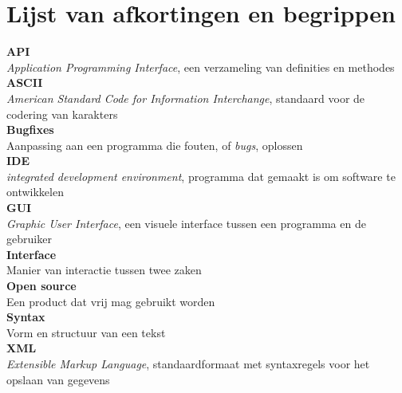 \chapter*{Lijst van afkortingen en begrippen}

\textbf{API}
\\ 
\textit{Application Programming Interface}, een verzameling van definities en methodes
\\
\textbf{ASCII}
\\ 
\textit{American Standard Code for Information Interchange}, standaard voor de codering van karakters
\\
\textbf{Bugfixes}
\\ 
Aanpassing aan een programma die fouten, of \textit{bugs}, oplossen 
\\
\textbf{IDE}
\\ 
\textit{integrated development environment}, programma dat gemaakt is om software te ontwikkelen
\\
\textbf{GUI} 
\\ 
\textit{Graphic User Interface}, een visuele interface tussen een programma en de gebruiker
\\
\textbf{Interface} 
\\ 
Manier van interactie tussen twee zaken
\\
\textbf{Open source}
\\ 
Een product dat vrij mag gebruikt worden
\\
\textbf{Syntax}
\\ 	
Vorm en structuur van een tekst
\\
\textbf{XML} 
\\
\textit{Extensible Markup Language}, standaardformaat met syntaxregels voor het opslaan van gegevens